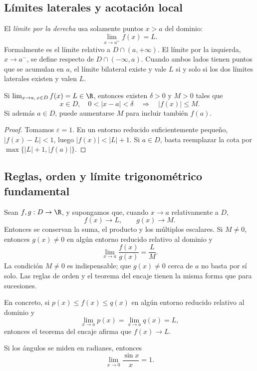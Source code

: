 \subsection{Límites laterales y acotación local}

El \emph{límite por la derecha} usa solamente puntos \(x>a\) del dominio:
\[
  \lim_{x\to a^+}f(x)=L.
\]
Formalmente es el límite relativo a \(D\cap(a,+\infty)\). El límite por la
izquierda, \(x\to a^-\), se define respecto de \(D\cap(-\infty,a)\). Cuando
ambos lados tienen puntos que se acumulan en \(a\), el límite bilateral existe
y vale \(L\) si y solo si los dos límites laterales existen y valen \(L\).

\begin{proposicion}
Si \(\lim_{x\to a,\,x\in D}f(x)=L\in\R\), entonces existen
\(\delta>0\) y \(M>0\) tales que
\[
 x\in D,\quad 0<|x-a|<\delta
 \quad\Longrightarrow\quad |f(x)|\le M.
\]
Si además \(a\in D\), puede aumentarse \(M\) para incluir también \(f(a)\).
\end{proposicion}

\begin{proof}
Tomamos \(\varepsilon=1\). En un entorno reducido suficientemente pequeño,
\(|f(x)-L|<1\), luego \(|f(x)|<|L|+1\). Si \(a\in D\), basta reemplazar la
cota por \(\max\{|L|+1,|f(a)|\}\).
\end{proof}

\subsection{Reglas, orden y límite trigonométrico fundamental}

Sean \(f,g:D\to\R\), y supongamos que, cuando \(x\to a\) relativamente a
\(D\),
\[
  f(x)\to L, \qquad g(x)\to M.
\]
Entonces se conservan la suma, el producto y los múltiplos escalares. Si
\(M\ne0\), entonces \(g(x)\ne0\) en algún entorno reducido relativo al
dominio y
\[
  \lim_{x\to a}\frac{f(x)}{g(x)}=\frac{L}{M}.
\]
La condición \(M\ne0\) es indispensable; que \(g(x)\ne0\) cerca de \(a\) no
basta por sí solo. Las reglas de orden y el teorema del encaje tienen la misma
forma que para sucesiones.

En concreto, si \(p(x)\le f(x)\le q(x)\) en algún entorno reducido relativo
al dominio y
\[
  \lim_{x\to a}p(x)=\lim_{x\to a}q(x)=L,
\]
entonces el teorema del encaje afirma que \(f(x)\to L\).

\begin{teorema}
Si los ángulos se miden en radianes, entonces
\[
  \lim_{x\to0}\frac{\sin x}{x}=1.
\]
\end{teorema}

